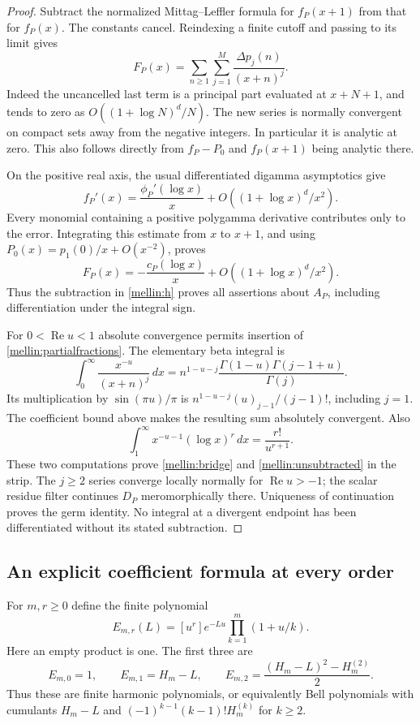 \documentclass[11pt,letterpaper]{article}
\theoremstyle{definition}
\theoremstyle{remark}
\numberwithin{equation}{section}
\begin{document}
\begin{proof}
Subtract the normalized Mittag--Leffler formula for $f_P(x+1)$ from
that for $f_P(x)$.  The constants cancel.  Reindexing a finite cutoff
and passing to its limit gives
\begin{equation}\label{mellin:partialfractions}
 F_P(x)=\sum_{n\ge1}\sum_{j=1}^{M}
               \frac{\Delta p_j(n)}{(x+n)^j}.
\end{equation}
Indeed the uncancelled last term is a principal part evaluated at
$x+N+1$, and tends to zero as
$O((1+\log N)^d/N)$.  The new series is normally convergent on
compact sets away from the negative integers.  In particular it is
analytic at zero.  This also follows directly from
$f_P-P_0$ and $f_P(x+1)$ being analytic there.

On the positive real axis, the usual differentiated digamma asymptotics
give
\[
 f_P'(x)=\frac{\phi_P'(\log x)}x
           +O((1+\log x)^d/x^2).
\]
Every monomial containing a positive polygamma derivative contributes
only to the error.  Integrating this estimate from $x$ to $x+1$, and
using $P_0(x)=p_1(0)/x+O(x^{-2})$, proves
\[
 F_P(x)=-\frac{c_P(\log x)}x
              +O((1+\log x)^d/x^2).
\]
Thus the subtraction in \eqref{mellin:h} proves all assertions about
$A_P$, including differentiation under the integral sign.

For $0<\operatorname{Re}u<1$ absolute convergence permits insertion
of \eqref{mellin:partialfractions}.  The elementary beta integral is
\[
 \int_0^\infty\frac{x^{-u}}{(x+n)^j}\,dx
 =n^{1-u-j}\frac{\Gamma(1-u)\Gamma(j-1+u)}{\Gamma(j)}.
\]
Its multiplication by $\sin(\pi u)/\pi$ is
$n^{1-u-j}(u)_{j-1}/(j-1)!$, including $j=1$.
The coefficient bound above makes the resulting sum absolutely
convergent.  Also
\[
 \int_1^\infty x^{-u-1}(\log x)^r\,dx=\frac{r!}{u^{r+1}}.
\]
These two computations prove \eqref{mellin:bridge} and
\eqref{mellin:unsubtracted} in the strip.  The $j\ge2$ series
converge locally normally for $\operatorname{Re}u>-1$; the scalar
residue filter continues $D_P$ meromorphically there.  Uniqueness of
continuation proves the germ identity.  No integral at a divergent
endpoint has been differentiated without its stated subtraction.
\end{proof}

\subsection{An explicit coefficient formula at every order}

For $m,r\ge0$ define the finite polynomial
\begin{equation}\label{mellin:E}
 E_{m,r}(L)=[u^r]e^{-Lu}\prod_{k=1}^{m}(1+u/k).
\end{equation}
Here an empty product is one.  The first three are
\[
 E_{m,0}=1,\qquad E_{m,1}=H_m-L,\qquad
 E_{m,2}=\frac{(H_m-L)^2-H_m^{(2)}}2.
\]
Thus these are finite harmonic polynomials, or equivalently Bell
polynomials with cumulants $H_m-L$ and
$(-1)^{k-1}(k-1)!H_m^{(k)}$ for $k\ge2$.
\end{document}
